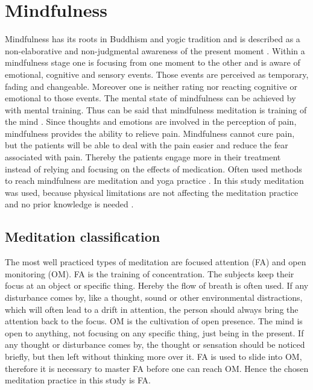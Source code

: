 \section{Mindfulness}
Mindfulness has its roots in Buddhism and yogic tradition and is described as a non-elaborative and non-judgmental awareness of the present moment \cite{Kabat1982,Zeidan2012,Zeidan2016,Tang2017}. Within a mindfulness stage one is focusing from one moment to the other and is aware of emotional, cognitive and sensory events. Those events are perceived as temporary, fading and changeable. Moreover one is neither rating nor reacting cognitive or emotional to those events. The mental state of mindfulness can be achieved by with mental training. \cite{Zeidan2012,Zeidan2016}  Thus can be said that mindfulness meditation is training of the mind \cite{Tang2017}. 
Since thoughts and emotions are involved in the perception of pain, mindfulness provides the ability to relieve pain. Mindfulness cannot cure pain, but the patients will be able to deal with the pain easier and reduce the fear associated with pain. Thereby the patients engage more in their treatment instead of relying and focusing on the effects of medication. \cite{Jacob2016}
Often used methods to reach mindfulness are meditation and yoga practice \cite{Kabat1982}.  In this study meditation was used, because physical limitations are not affecting the meditation practice and no prior knowledge is needed \cite{Tang2017}.


\subsection{Meditation classification}
The most well practiced types of meditation are focused attention (FA) and open monitoring (OM).\cite{Zeidan2016} FA is the training of concentration. The subjects keep their focus at an object or specific thing. Hereby the flow of breath is often used.  If any disturbance comes by, like a thought, sound or other environmental distractions, which will often lead to a drift in attention, the person should always bring the attention back to the focus. \cite{Zeidan2016} OM is the cultivation of open presence. The mind is open to anything, not focusing on any specific thing, just being in the present. If any thought or disturbance comes by, the thought or sensation should be noticed briefly, but then left without thinking more over it. FA is used to slide into OM, therefore it is necessary to master FA before one can reach OM. \cite{ Perlman2016, Zeidan2016,Kabat1982} Hence the chosen meditation practice in this study is FA.



